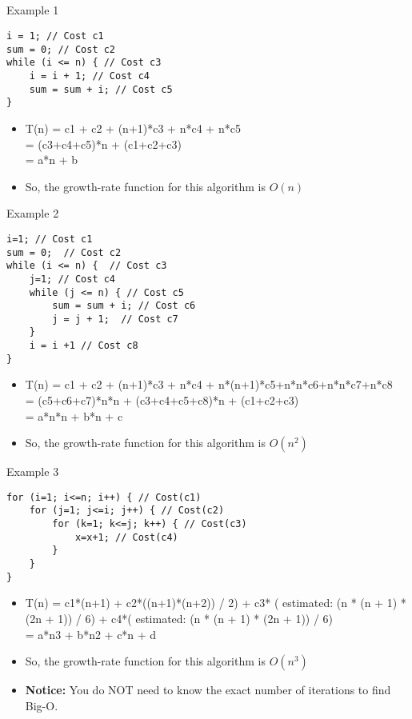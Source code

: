 \documentclass{beamer}
\begin{document}
\subsection{}
\begin{frame}[fragile]{Example 1}
\begin{lstlisting}
i = 1; // Cost c1
sum = 0; // Cost c2
while (i <= n) { // Cost c3
    i = i + 1; // Cost c4
    sum = sum + i; // Cost c5
} 
\end{lstlisting}
\begin{itemize}
\item <2-> T(n)  =  c1 + c2 + (n+1)*c3 + n*c4 + n*c5 \\
            = (c3+c4+c5)*n + (c1+c2+c3) \\
            = a*n + b
\item <2-> So, the growth-rate function for this algorithm is $O(n)$
\end{itemize}
\end{frame}

\begin{frame}[fragile]{Example 2}
\begin{lstlisting}
i=1; // Cost c1
sum = 0;  // Cost c2
while (i <= n) {  // Cost c3
    j=1; // Cost c4
    while (j <= n) { // Cost c5
        sum = sum + i; // Cost c6
        j = j + 1;  // Cost c7
    }
    i = i +1 // Cost c8
}
\end{lstlisting}
\begin{itemize}
\item <2-> T(n)  =  c1 + c2 + (n+1)*c3 + n*c4 + n*(n+1)*c5+n*n*c6+n*n*c7+n*c8 \\
            = (c5+c6+c7)*n*n + (c3+c4+c5+c8)*n + (c1+c2+c3) \\
            = a*n*n + b*n + c \\
\item <2-> So, the growth-rate function for this algorithm is $O(n^2)$
\end{itemize}
\end{frame}

\begin{frame}[fragile]{Example 3}
\begin{lstlisting}
for (i=1; i<=n; i++) { // Cost(c1)
    for (j=1; j<=i; j++) { // Cost(c2)
        for (k=1; k<=j; k++) { // Cost(c3)
            x=x+1; // Cost(c4)
        }
    }
}
\end{lstlisting}
\begin{itemize}
\item <2-> T(n)  =  c1*(n+1) + c2*((n+1)*(n+2)) / 2) + c3* ( estimated: (n * (n + 1) * (2n + 1)) / 6) + c4*( estimated: (n * (n + 1) * (2n + 1)) / 6) \\
            = a*n3 + b*n2 + c*n + d
\item <2-> So, the growth-rate function for this algorithm is $O(n^3)$
\item <2-> \textbf{Notice:} You do NOT need to know the exact number of iterations to find Big-O.
\end{itemize}
\end{frame}
\end{document}
